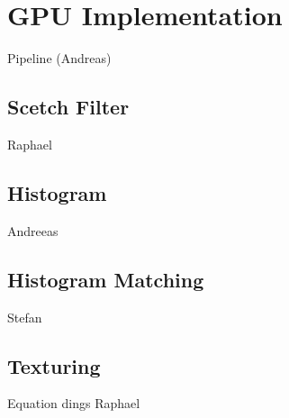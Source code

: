 \section{GPU Implementation} \label{gpu-implementation}
Pipeline (Andreas)

\subsection{Scetch Filter}
Raphael
\subsection{Histogram}
Andreeas
\subsection{Histogram Matching}
Stefan
\subsection{Texturing}
Equation dings Raphael
